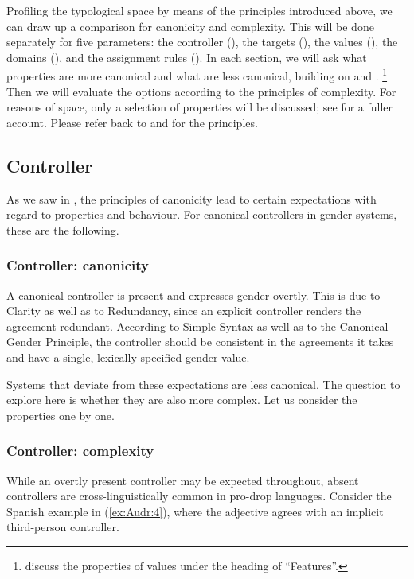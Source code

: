 \documentclass[output=collectionpaper]{langsci/langscibook}
\begin{document}
Profiling the typological space by means of the principles introduced above, we can draw up a comparison for canonicity and complexity. This will be done separately for five parameters: the controller (), the targets (), the values (), the domains (), and the assignment rules (). In each section, we will ask what properties are more canonical and what are less canonical, building on \citet{Corbett2006,Corbett2012} and \citet{Corbett2016}.%
\footnote{\cite[514--517]{Corbett2016} discuss the properties of values under the heading of ``Features''.} %
Then we will evaluate the options according to the principles of complexity. For reasons of space, only a selection of properties will be discussed; see \citet{Audring2017} for a fuller account. Please refer back to  and  for the principles.

\subsection{Controller}
\label{sec:Audr:3.2}

As we saw in , the principles of canonicity lead to certain expectations with regard to properties and behaviour. For canonical controllers in gender systems, these are the following.

\subsubsection{Controller: canonicity}

A canonical controller is present and expresses gender overtly. This is due to Clarity as well as to Redundancy, since an explicit controller renders the agreement redundant. According to Simple Syntax as well as to the Canonical Gender Principle, the controller should be consistent in the agreements it takes and have a single, lexically specified gender value.

Systems that deviate from these expectations are less canonical. The question to explore here is whether they are also more complex. Let us consider the properties one by one.

\subsubsection{Controller: complexity}

While an overtly present controller may be expected throughout, absent controllers are cross-linguistically common in pro-drop languages. Consider the Spanish example in (\ref{ex:Audr:4}), where the adjective agrees with an implicit third-person controller.
\end{document}
